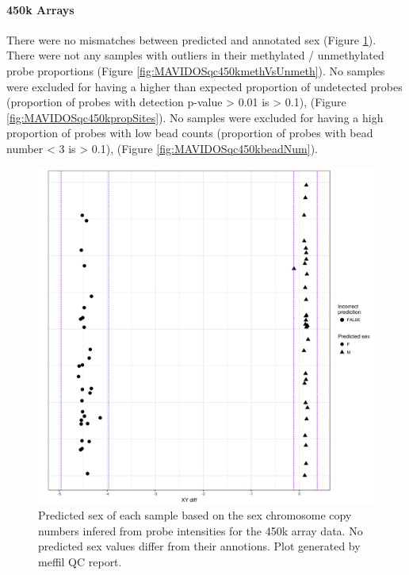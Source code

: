 \documentclass[]{book}
\let\oldparagraph\paragraph
\renewcommand{\paragraph}[1]{\oldparagraph{#1}\mbox{}}
\begin{document}
\hypertarget{k-arrays}{%
\paragraph{450k Arrays}\label{k-arrays}}

There were no mismatches between predicted and annotated sex (Figure \ref{fig:MAVIDOSqc450ksexMismatch}). There were not any samples with outliers in their methylated / unmethylated probe proportions (Figure \ref{fig:MAVIDOSqc450kmethVsUnmeth}). No samples were excluded for having a higher than expected proportion of undetected probes (proportion of probes with detection p-value \textgreater{} 0.01 is \textgreater{} 0.1), (Figure \ref{fig:MAVIDOSqc450kpropSites}). No samples were excluded for having a high proportion of probes with low bead counts (proportion of probes with bead number \textless{} 3 is \textgreater{} 0.1), (Figure \ref{fig:MAVIDOSqc450kbeadNum}).

\begin{figure}

{\centering \includegraphics[width=0.8\linewidth]{figs/MAVIDOSqc450ksexMismatch} 

}

\caption{Predicted sex of each sample based on the sex chromosome copy numbers infered from probe intensities for the 450k array data. No predicted sex values differ from their annotions. Plot generated by meffil QC report.}\label{fig:MAVIDOSqc450ksexMismatch}
\end{figure}
\end{document}
